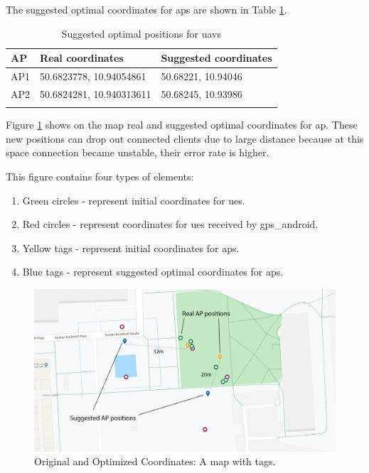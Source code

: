 The suggested optimal coordinates for \glspl{ap} are shown in Table \ref{tab:optimal-coordinates}.

\begin{longtable}[]{@{}lll@{}}
	\caption{Suggested optimal positions for \glspl{uav} }\tabularnewline
	\toprule
	AP & Real coordinates & Suggested coordinates\tabularnewline
	\midrule
	\endhead
	AP1 & 50.6823778, 10.94054861 & 50.68221, 10.94046\tabularnewline
	AP2 & 50.6824281, 10.940313611 & 50.68245, 10.93986\tabularnewline
	\bottomrule
	\label{tab:optimal-coordinates}
\end{longtable}

Figure \ref{fig:optimized-coordinates-on-logical-map} shows on the map real and suggested optimal coordinates for \gls{ap}. These new positions can drop out connected clients due to large distance because at this space connection became unstable, their error rate is higher.

This figure contains four types of elements:

\begin{enumerate}
	\item Green circles - represent initial coordinates for \glspl{ue}.
	
	\item Red circles - represent coordinates for \glspl{ue} received by \gls{gps_android}.
	
	\item Yellow tags - represent initial coordinates for \glspl{ap}.
	
	\item Blue tags - represent suggested optimal coordinates for \glspl{ap}.
	
\end{enumerate}

\begin{figure}[H]
	\centering
	\includegraphics[width=\linewidth,keepaspectratio]{images/Expt4_Result_of_optimization_map_with_names.png}
	\caption{Original and Optimized Coordinates: A map with tags.}
	\label{fig:optimized-coordinates-on-logical-map}
\end{figure}

